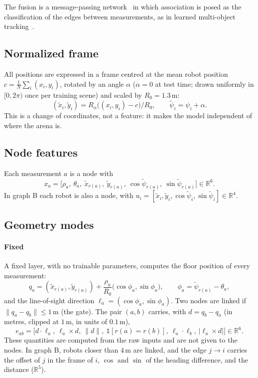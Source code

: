 \documentclass[conference]{IEEEtran}
\newcommand{\R}{\mathbb{R}}
\begin{document}
The fusion is a message-passing network~\cite{gilmer2017,battaglia2018} in which association is posed as the
classification of the edges between measurements, as in learned multi-object tracking~\cite{braso2020}.

\subsection{Normalized frame}
All positions are expressed in a frame centred at the mean robot position $c=\frac1N\sum_i(x_i,y_i)$, rotated by an
angle $\alpha$ ($\alpha=0$ at test time; drawn uniformly in $[0,2\pi)$ once per training scene) and scaled by
$R_0=1.3$\,m:
\begin{equation}
(\tilde x_i,\tilde y_i)=R_\alpha\bigl((x_i,y_i)-c\bigr)/R_0,\qquad \tilde\psi_i=\psi_i+\alpha.
\end{equation}
This is a change of coordinates, not a feature: it makes the model independent of where the arena is.

\subsection{Node features}
Each measurement $a$ is a node with
\begin{equation}
x_a=\bigl[\rho_a,\ \theta_a,\ \tilde x_{r(a)},\ \tilde y_{r(a)},\ \cos\tilde\psi_{r(a)},\ \sin\tilde\psi_{r(a)}\bigr]\in\R^6.
\end{equation}
In graph B each robot is also a node, with $u_i=[\tilde x_i,\tilde y_i,\cos\tilde\psi_i,\sin\tilde\psi_i]\in\R^4$.

\subsection{Geometry modes}
\paragraph{Fixed} A fixed layer, with no trainable parameters, computes the floor position of every measurement:
\begin{equation}
q_a=(\tilde x_{r(a)},\tilde y_{r(a)})+\frac{\rho_a}{R_0}\bigl(\cos\phi_a,\sin\phi_a\bigr),\qquad
\phi_a=\tilde\psi_{r(a)}-\theta_a,
\end{equation}
and the line-of-sight direction $\ell_a=(\cos\phi_a,\sin\phi_a)$. Two nodes are linked if $\|q_a-q_b\|\le1$\,m
(the gate). The pair $(a,b)$ carries, with $d=q_b-q_a$ (in metres, clipped at $1$\,m, in units of $0.1$\,m),
\begin{equation}
e_{ab}=\bigl[d\cdot\ell_a,\ \ell_a\times d,\ \|d\|,\ \mathbb 1[r(a)=r(b)],\ \ell_a\cdot\ell_b,\ |\ell_a\times d|\bigr]\in\R^6 .
\end{equation}
These quantities are computed from the raw inputs and are not given to the nodes. In graph B, robots closer than
$4$\,m are linked, and the edge $j\to i$ carries the offset of $j$ in the frame of $i$, $\cos$ and $\sin$ of the
heading difference, and the distance ($\R^5$).
\end{document}
